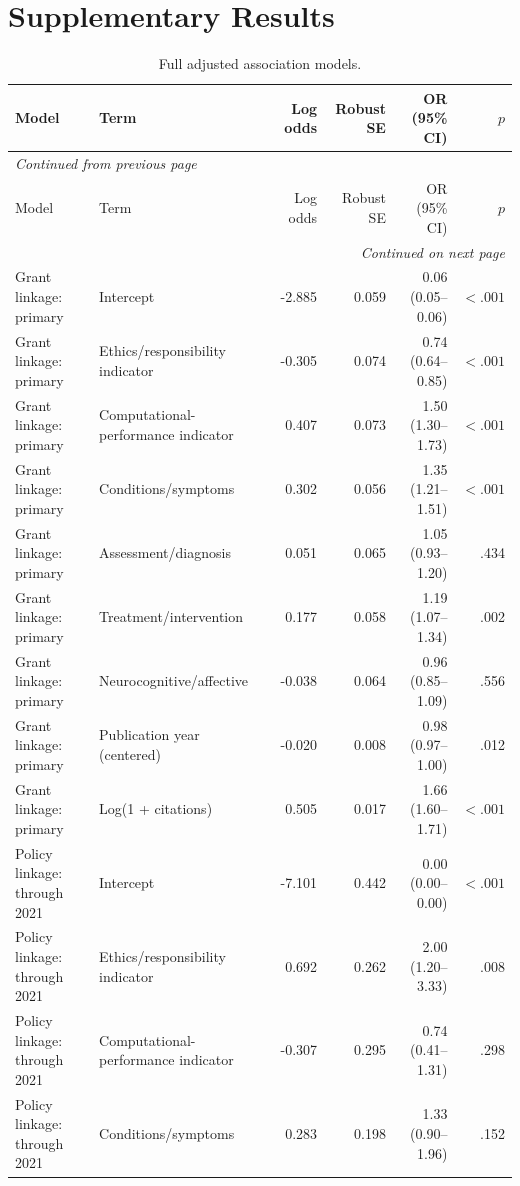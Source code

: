 \documentclass[11pt]{article}
\begin{document}
\section*{Supplementary Results}
\begin{longtable}{p{4.0cm}p{4.0cm}rrrr}
\caption{Full adjusted association models.}\label{tab:s1-full-models}\\
\toprule
Model & Term & Log odds & Robust SE & OR (95\% CI) & $p$ \\
\midrule
\endfirsthead
\multicolumn{6}{l}{\small\itshape Continued from previous page} \\
\toprule
Model & Term & Log odds & Robust SE & OR (95\% CI) & $p$ \\
\midrule
\endhead
\midrule
\multicolumn{6}{r}{\small\itshape Continued on next page} \\
\endfoot
\bottomrule
\endlastfoot
Grant linkage: primary & Intercept & -2.885 & 0.059 & 0.06 (0.05--0.06) & $<.001$ \\
Grant linkage: primary & Ethics/responsibility indicator & -0.305 & 0.074 & 0.74 (0.64--0.85) & $<.001$ \\
Grant linkage: primary & Computational-performance indicator & 0.407 & 0.073 & 1.50 (1.30--1.73) & $<.001$ \\
Grant linkage: primary & Conditions/symptoms & 0.302 & 0.056 & 1.35 (1.21--1.51) & $<.001$ \\
Grant linkage: primary & Assessment/diagnosis & 0.051 & 0.065 & 1.05 (0.93--1.20) & .434 \\
Grant linkage: primary & Treatment/intervention & 0.177 & 0.058 & 1.19 (1.07--1.34) & .002 \\
Grant linkage: primary & Neurocognitive/affective & -0.038 & 0.064 & 0.96 (0.85--1.09) & .556 \\
Grant linkage: primary & Publication year (centered) & -0.020 & 0.008 & 0.98 (0.97--1.00) & .012 \\
Grant linkage: primary & Log(1 + citations) & 0.505 & 0.017 & 1.66 (1.60--1.71) & $<.001$ \\
Policy linkage: through 2021 & Intercept & -7.101 & 0.442 & 0.00 (0.00--0.00) & $<.001$ \\
Policy linkage: through 2021 & Ethics/responsibility indicator & 0.692 & 0.262 & 2.00 (1.20--3.33) & .008 \\
Policy linkage: through 2021 & Computational-performance indicator & -0.307 & 0.295 & 0.74 (0.41--1.31) & .298 \\
Policy linkage: through 2021 & Conditions/symptoms & 0.283 & 0.198 & 1.33 (0.90--1.96) & .152 \\

\end{longtable}
\end{document}
